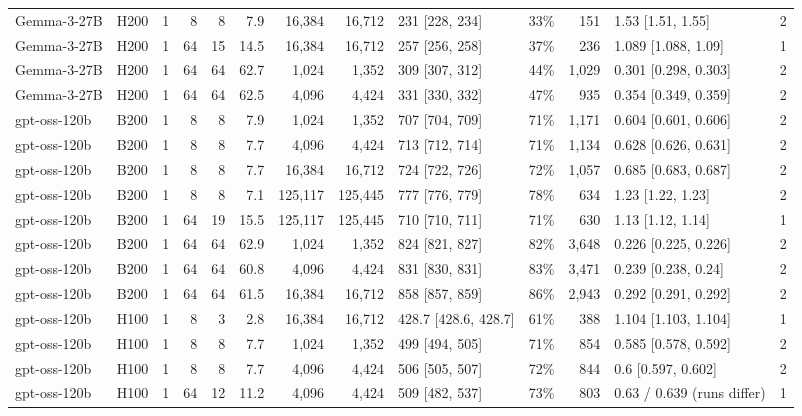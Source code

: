 \begin{landscape}
\begin{longtable}{llrrrrrrlrrlr}
Gemma-3-27B & H200 & 1 & 8 & 8 & 7.9 & 16,384 & 16,712 & 231 {[}228, 234{]} & 33\% & 151 & 1.53 {[}1.51, 1.55{]} & 2 \\
Gemma-3-27B & H200 & 1 & 64 & 15 & 14.5 & 16,384 & 16,712 & 257 {[}256, 258{]} & 37\% & 236 & 1.089 {[}1.088, 1.09{]} & 1 \\
Gemma-3-27B & H200 & 1 & 64 & 64 & 62.7 & 1,024 & 1,352 & 309 {[}307, 312{]} & 44\% & 1,029 & 0.301 {[}0.298, 0.303{]} & 2 \\
Gemma-3-27B & H200 & 1 & 64 & 64 & 62.5 & 4,096 & 4,424 & 331 {[}330, 332{]} & 47\% & 935 & 0.354 {[}0.349, 0.359{]} & 2 \\
gpt-oss-120b & B200 & 1 & 8 & 8 & 7.9 & 1,024 & 1,352 & 707 {[}704, 709{]} & 71\% & 1,171 & 0.604 {[}0.601, 0.606{]} & 2 \\
gpt-oss-120b & B200 & 1 & 8 & 8 & 7.7 & 4,096 & 4,424 & 713 {[}712, 714{]} & 71\% & 1,134 & 0.628 {[}0.626, 0.631{]} & 2 \\
gpt-oss-120b & B200 & 1 & 8 & 8 & 7.7 & 16,384 & 16,712 & 724 {[}722, 726{]} & 72\% & 1,057 & 0.685 {[}0.683, 0.687{]} & 2 \\
gpt-oss-120b & B200 & 1 & 8 & 8 & 7.1 & 125,117 & 125,445 & 777 {[}776, 779{]} & 78\% & 634 & 1.23 {[}1.22, 1.23{]} & 2 \\
gpt-oss-120b & B200 & 1 & 64 & 19 & 15.5 & 125,117 & 125,445 & 710 {[}710, 711{]} & 71\% & 630 & 1.13 {[}1.12, 1.14{]} & 1 \\
gpt-oss-120b & B200 & 1 & 64 & 64 & 62.9 & 1,024 & 1,352 & 824 {[}821, 827{]} & 82\% & 3,648 & 0.226 {[}0.225, 0.226{]} & 2 \\
gpt-oss-120b & B200 & 1 & 64 & 64 & 60.8 & 4,096 & 4,424 & 831 {[}830, 831{]} & 83\% & 3,471 & 0.239 {[}0.238, 0.24{]} & 2 \\
gpt-oss-120b & B200 & 1 & 64 & 64 & 61.5 & 16,384 & 16,712 & 858 {[}857, 859{]} & 86\% & 2,943 & 0.292 {[}0.291, 0.292{]} & 2 \\
gpt-oss-120b & H100 & 1 & 8 & 3 & 2.8 & 16,384 & 16,712 & 428.7 {[}428.6, 428.7{]} & 61\% & 388 & 1.104 {[}1.103, 1.104{]} & 1 \\
gpt-oss-120b & H100 & 1 & 8 & 8 & 7.7 & 1,024 & 1,352 & 499 {[}494, 505{]} & 71\% & 854 & 0.585 {[}0.578, 0.592{]} & 2 \\
gpt-oss-120b & H100 & 1 & 8 & 8 & 7.7 & 4,096 & 4,424 & 506 {[}505, 507{]} & 72\% & 844 & 0.6 {[}0.597, 0.602{]} & 2 \\
gpt-oss-120b & H100 & 1 & 64 & 12 & 11.2 & 4,096 & 4,424 & 509 {[}482, 537{]} & 73\% & 803 & 0.63 / 0.639 (runs differ) & 1 \\

\end{longtable}
\end{landscape}
